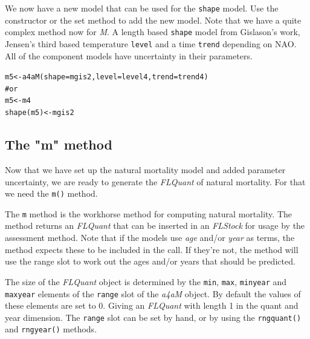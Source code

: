 \documentclass[a4paper,english,10pt]{article}\usepackage[]{graphicx}\usepackage[]{color}
\makeatletter
\newcommand{\hlcom}[1]{\textcolor[rgb]{0.2,0.267,0.4}{#1}}%
\newcommand{\hlstd}[1]{\textcolor[rgb]{0,0,0}{#1}}%
\newcommand{\hlkwb}[1]{\textcolor[rgb]{0.361,0.506,0.596}{#1}}%
\newcommand{\hlkwc}[1]{\textcolor[rgb]{0.361,0.506,0.596}{#1}}%
\newcommand{\hlkwd}[1]{\textcolor[rgb]{0.361,0.506,0.596}{#1}}%
\newenvironment{kframe}{%
 \def\at@end@of@kframe{}%
 \ifinner\ifhmode%
  \def\at@end@of@kframe{\end{minipage}}%
  \begin{minipage}{\columnwidth}%
 \fi\fi%
 \def\FrameCommand##1{\hskip\@totalleftmargin \hskip-\fboxsep
 \colorbox{shadecolor}{##1}\hskip-\fboxsep
     \hskip-\linewidth \hskip-\@totalleftmargin \hskip\columnwidth}%
 \MakeFramed {\advance\hsize-\width
   \@totalleftmargin\z@ \linewidth\hsize
   \@setminipage}}%
 {\par\unskip\endMakeFramed%
 \at@end@of@kframe}
\newenvironment{knitrout}{}{} %
\newcommand{\code}[1]{{\texttt{#1}}}
\newcommand{\class}[1]{{\textit{#1}}}
\makeatother
\begin{document}
We now have a new model that can be used for the \code{shape} model. Use the constructor or the set method to add the new model. Note that we have a quite complex method now for \emph{M}. A length based \code{shape} model from Gislason's work, Jensen's third based temperature \code{level} and a time \code{trend} depending on NAO. All of the component models have uncertainty in their parameters.

\begin{knitrout}
\color{fgcolor}\begin{kframe}
\begin{alltt}
\hlstd{m5} \hlkwb{<-} \hlkwd{a4aM}\hlstd{(}\hlkwc{shape} \hlstd{= mgis2,} \hlkwc{level} \hlstd{= level4,} \hlkwc{trend} \hlstd{= trend4)}
\hlcom{# or}
\hlstd{m5} \hlkwb{<-} \hlstd{m4}
\hlkwd{shape}\hlstd{(m5)} \hlkwb{<-} \hlstd{mgis2}
\end{alltt}
\end{kframe}
\end{knitrout}


\subsection{The "m" method}

Now that we have set up the natural mortality model and added parameter uncertainty, we are ready to generate the \class{FLQuant} of natural mortality. For that we need the \code{m()} method.

The \code{m} method is the workhorse method for computing natural mortality. The method returns an \class{FLQuant} that can be inserted in an \class{FLStock} for usage by the assessment method. Note that if the models use \emph{age} and/or \emph{year} as terms, the method expects these to be included in the call. If they're not, the method will use the range slot to work out the ages and/or years that should be predicted.


The size of the \class{FLQuant} object is determined by the \code{min}, \code{max}, \code{minyear} and \code{maxyear} elements of the \code{range} slot of the \class{a4aM} object. By default the values of these elements are set to 0. Giving an \class{FLQuant} with length 1 in the quant and year dimension. The \code{range} slot can be set by hand, or by using the \code{rngquant()} and \code{rngyear()} methods.
\end{document}
